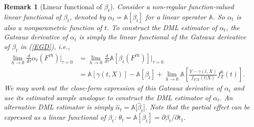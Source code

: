\documentclass[lettersize, 12pt]{article}
\newtheorem{remark}{Remark}
\begin{document}
{%

\begin{remark}[Linear functional of $\beta_t$]
{\rm
Consider a non-regular function-valued linear functional of $\beta_t$, denoted by $\alpha_t = \mathbb{A}[\beta_t]$ for a linear operator $\mathbb{A}$.  
So $\alpha_t$ is also a nonparametric function of $t$.
 To construct the DML estimator of $\alpha_t$, the Gateaux derivative of $\alpha_t$ is simply the linear functional of the Gateaux derivative of $\beta_t$ in (\ref{EGD}), i.e.,
 \begin{align*} 
\lim_{h\rightarrow 0}
\frac{d}{d \tau}\alpha_t(F^{\tau h})\Big|_{\tau = 0}  &= \lim_{h\rightarrow 0}\frac{d}{d \tau}\mathbb{A}\left[\beta_t(F^{\tau h})\right]\Big|_{\tau = 0} 
\\&=  \mathbb{A}[\gamma(t,X)] -  \mathbb{A}[\beta_t] + \lim_{h\rightarrow 0} \mathbb{A}\left[\frac{Y - \gamma(t,X)}{f_{T|X}(t|X)} f_T^h(t)\right].
 \end{align*}
We may work out the close-form expression of this Gateaux derivative of $\alpha_t$ and use its estimated sample analogue to construct the DML estimator of $\alpha_t$. 
An alternative DML estimator is simply $\hat\alpha_t = \mathbb{A}\big[\hat\beta_t\big]$.
Note that the partial effect can be expressed as a linear functional of $\beta_t$: $\theta_t = \mathbb{A}[\beta_t] = \partial \beta_t/\partial {t_1}$.
}
\label{Ralpha}
\end{remark}

}
\end{document}
